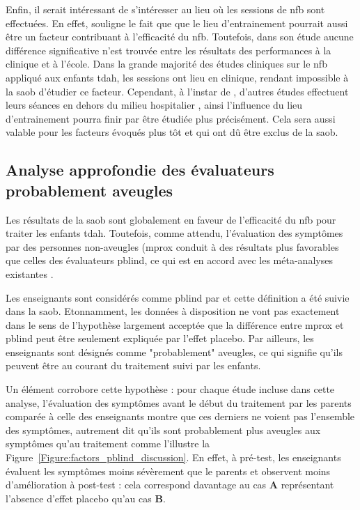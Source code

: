 Enfin, il serait intéressant de s'intéresser au lieu où les sessions de \gls{nfb} sont effectuées. En effet, \citet{Minder2018} souligne le fait que que le lieu
d'entrainement pourrait aussi être un facteur contribuant à l'efficacité du \gls{nfb}. Toutefois, dans son étude aucune différence significative n'est trouvée entre
les résultats des performances à la clinique et à l'école. Dans la grande majorité des études cliniques sur le \gls{nfb} appliqué aux enfants
\gls{tdah}, les sessions ont lieu en clinique, rendant impossible à la \gls{saob} d'étudier ce facteur. Cependant, à l'instar de \citet{Minder2018}, d'autres 
études effectuent leurs séances en dehors du milieu hospitalier \citep{Bioulac2019}, ainsi l'influence du lieu d'entrainement pourra finir par être étudiée
plus précisément. Cela sera aussi valable pour les facteurs évoqués plus tôt et qui ont dû être exclus de la \gls{saob}.

\subsection{Analyse approfondie des évaluateurs probablement aveugles}

Les résultats de la \gls{saob} sont globalement en faveur de l'efficacité du \gls{nfb} pour traiter les enfants \gls{tdah}. Toutefois, comme attendu, l'évaluation
des symptômes par des personnes non-aveugles (\gls{mprox} conduit à des résultats plus favorables que celles des évaluateurs \gls{pblind}, ce qui est en accord avec les
méta-analyses existantes \citep{Micoulaud2014, Cortese2016}. 

Les enseignants sont considérés comme \gls{pblind} par \citet{Cortese2016, Micoulaud2014} et cette définition a été suivie dans la \gls{saob}. Etonnamment, les données
à disposition ne vont pas exactement dans le sens de l'hypothèse largement acceptée que la différence entre \gls{mprox} et \gls{pblind} peut être seulement 
expliquée par l'effet placebo. Par ailleurs, les enseignants sont désignés comme "probablement" aveugles, ce qui signifie qu'ils peuvent être au courant du
traitement suivi par les enfants. 

Un élément corrobore cette hypothèse : pour chaque étude incluse dans cette analyse, l'évaluation des symptômes avant le début
du traitement par les parents comparée à celle des enseignants montre que ces derniers ne voient pas l'ensemble des symptômes, autrement dit qu'ils sont probablement
plus aveugles aux symptômes qu'au traitement comme l'illustre la Figure~\ref{Figure:factors_pblind_discussion}. En effet, à pré-test, les enseignants évaluent les 
symptômes moins sévèrement que le parents et observent moins d'amélioration à post-test : cela correspond davantage au cas \textbf{A} représentant l'absence d'effet placebo
qu'au cas \textbf{B}.

